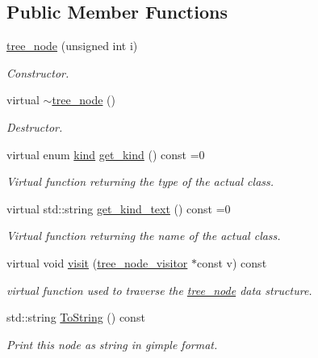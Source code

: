 \subsection*{Public Member Functions}
\begin{DoxyCompactItemize}
\item 
\hyperlink{classtree__node_a5e40829fa0df70a89f974c8e6f0242aa}{tree\+\_\+node} (unsigned int i)
\begin{DoxyCompactList}\small\item\em Constructor. \end{DoxyCompactList}\item 
virtual \hyperlink{classtree__node_a44550db0a707dd886f968eff42bb681c}{$\sim$tree\+\_\+node} ()
\begin{DoxyCompactList}\small\item\em Destructor. \end{DoxyCompactList}\item 
virtual enum \hyperlink{tree__common_8hpp_a9efbd7c7191fb190b76c2fd05d6e7b45}{kind} \hyperlink{classtree__node_aa020fd7c4ac6d0d748c8b8512809b136}{get\+\_\+kind} () const =0
\begin{DoxyCompactList}\small\item\em Virtual function returning the type of the actual class. \end{DoxyCompactList}\item 
virtual std\+::string \hyperlink{classtree__node_a824fb7ac3aca5d1eb55aee0c993e6d0d}{get\+\_\+kind\+\_\+text} () const =0
\begin{DoxyCompactList}\small\item\em Virtual function returning the name of the actual class. \end{DoxyCompactList}\item 
virtual void \hyperlink{classtree__node_aa9abba3f1b30e0be80b4a56b188c6ecc}{visit} (\hyperlink{classtree__node__visitor}{tree\+\_\+node\+\_\+visitor} $\ast$const v) const
\begin{DoxyCompactList}\small\item\em virtual function used to traverse the \hyperlink{classtree__node}{tree\+\_\+node} data structure. \end{DoxyCompactList}\item 
std\+::string \hyperlink{classtree__node_a17760b9b2ecf3ad8bfd015ce90f60234}{To\+String} () const
\begin{DoxyCompactList}\small\item\em Print this node as string in gimple format. \end{DoxyCompactList}\end{DoxyCompactItemize}
